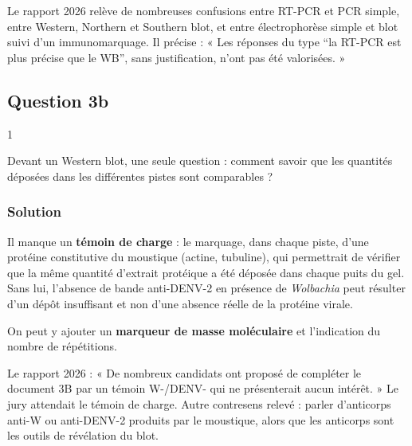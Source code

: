 \documentclass[11pt,a4paper]{article}
\begin{document}
\begin{jury}

Le rapport 2026 relève de nombreuses confusions entre RT-PCR et PCR simple, entre Western, Northern et Southern blot, et entre électrophorèse simple et blot suivi d'un immunomarquage. Il précise : « Les réponses du type ``la RT-PCR est plus précise que le WB'', sans justification, n'ont pas été valorisées. »

\end{jury}

\hypertarget{question-3b}{%
\subsection{Question 3b}\label{question-3b}}

\begin{indication}{1}

Devant un Western blot, une seule question : comment savoir que les quantités déposées dans les différentes pistes sont comparables ?

\end{indication}

\hypertarget{solution-47}{%
\subsubsection{Solution}\label{solution-47}}

Il manque un \textbf{témoin de charge} : le marquage, dans chaque piste, d'une protéine constitutive du moustique (actine, tubuline), qui permettrait de vérifier que la même quantité d'extrait protéique a été déposée dans chaque puits du gel. Sans lui, l'absence de bande anti-DENV-2 en présence de \emph{Wolbachia} peut résulter d'un dépôt insuffisant et non d'une absence réelle de la protéine virale.

On peut y ajouter un \textbf{marqueur de masse moléculaire} et l'indication du nombre de répétitions.

\begin{piege}

Le rapport 2026 : « De nombreux candidats ont proposé de compléter le document 3B par un témoin W-/DENV- qui ne présenterait aucun intérêt. » Le jury attendait le témoin de charge. Autre contresens relevé : parler d'anticorps anti-W ou anti-DENV-2 produits par le moustique, alors que les anticorps sont les outils de révélation du blot.

\end{piege}
\end{document}

